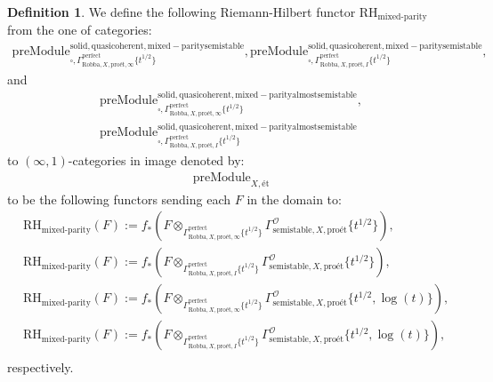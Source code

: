 \documentclass[12pt]{book}
\theoremstyle{definition}
\newtheorem{definition}{Definition}
\begin{document}
\begin{definition}
We define the following Riemann-Hilbert functor $\text{RH}_\text{mixed-parity}$ from the one of categories:
\begin{align}
\mathrm{preModule}^\mathrm{solid,quasicoherent,mixed-paritysemistable}_{\square,\Gamma^\mathrm{perfect}_{\text{Robba},X,\text{pro\'et},\infty}\{t^{1/2}\}},
\mathrm{preModule}^\mathrm{solid,quasicoherent,mixed-paritysemistable}_{\square,\Gamma^\mathrm{perfect}_{\text{Robba},X,\text{pro\'et},I}\{t^{1/2}\}}, 
\end{align}
and
\begin{align}
\mathrm{preModule}^\mathrm{solid,quasicoherent,mixed-parityalmostsemistable}_{\square,\Gamma^\mathrm{perfect}_{\text{Robba},X,\text{pro\'et},\infty}\{t^{1/2}\}},\\
\mathrm{preModule}^\mathrm{solid,quasicoherent,mixed-parityalmostsemistable}_{\square,\Gamma^\mathrm{perfect}_{\text{Robba},X,\text{pro\'et},I}\{t^{1/2}\}} 
\end{align}
to $(\infty,1)$-categories in image denoted by:
\begin{align}
\mathrm{preModule}_{X,\text{\'et}}
\end{align}
to be the following functors sending each $F$ in the domain to:
\begin{align}
&\text{RH}_\text{mixed-parity}(F):=f_*(F\otimes_{\Gamma^\mathrm{perfect}_{\text{Robba},X,\text{pro\'et},\infty}\{t^{1/2}\}} \Gamma^\mathcal{O}_{\text{semistable},X,\text{pro\'et}}\{t^{1/2}\}),\\
&\text{RH}_\text{mixed-parity}(F):=f_*(F\otimes_{\Gamma^\mathrm{perfect}_{\text{Robba},X,\text{pro\'et},I}\{t^{1/2}\}} \Gamma^\mathcal{O}_{\text{semistable},X,\text{pro\'et}}\{t^{1/2}\}),\\
&\text{RH}_\text{mixed-parity}(F):=f_*(F\otimes_{\Gamma^\mathrm{perfect}_{\text{Robba},X,\text{pro\'et},\infty}\{t^{1/2}\}} \Gamma^\mathcal{O}_{\text{semistable},X,\text{pro\'et}}\{t^{1/2},\log(t)\}),\\
&\text{RH}_\text{mixed-parity}(F):=f_*(F\otimes_{\Gamma^\mathrm{perfect}_{\text{Robba},X,\text{pro\'et},I}\{t^{1/2}\}} \Gamma^\mathcal{O}_{\text{semistable},X,\text{pro\'et}}\{t^{1/2},\log(t)\}),\\
\end{align}
respectively.

\end{definition}
\end{document}
